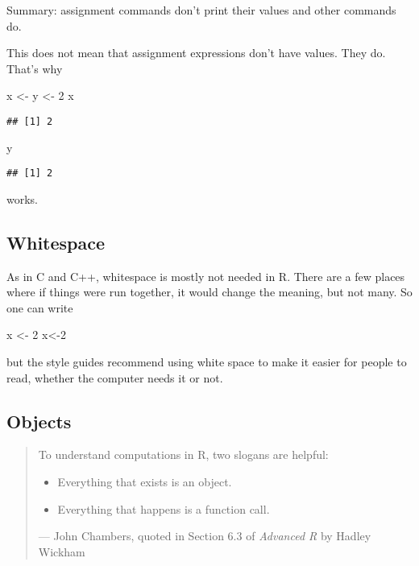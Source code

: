 \documentclass[
]{article}
\newenvironment{Shaded}{\begin{snugshade}}{\end{snugshade}}
\newcommand{\DecValTok}[1]{\textcolor[rgb]{0.00,0.00,0.81}{#1}}
\newcommand{\NormalTok}[1]{#1}
\newcommand{\OtherTok}[1]{\textcolor[rgb]{0.56,0.35,0.01}{#1}}
\providecommand{\tightlist}{%
  \setlength{\itemsep}{0pt}\setlength{\parskip}{0pt}}
\begin{document}
Summary: assignment commands don't print their values and other commands
do.

This does not mean that assignment expressions don't have values. They
do. That's why

\begin{Shaded}
\begin{Highlighting}[]
\NormalTok{x }\OtherTok{\textless{}{-}}\NormalTok{ y }\OtherTok{\textless{}{-}} \DecValTok{2}
\NormalTok{x}
\end{Highlighting}
\end{Shaded}

\begin{verbatim}
## [1] 2
\end{verbatim}

\begin{Shaded}
\begin{Highlighting}[]
\NormalTok{y}
\end{Highlighting}
\end{Shaded}

\begin{verbatim}
## [1] 2
\end{verbatim}

works.

\hypertarget{whitespace}{%
\subsection{Whitespace}\label{whitespace}}

As in C and C++, whitespace is mostly not needed in R. There are a few
places where if things were run together, it would change the meaning,
but not many. So one can write

\begin{Shaded}
\begin{Highlighting}[]
\NormalTok{x }\OtherTok{\textless{}{-}} \DecValTok{2}
\NormalTok{x}\OtherTok{\textless{}{-}}\DecValTok{2}
\end{Highlighting}
\end{Shaded}

but the style guides recommend using white space to make it easier for
people to read, whether the computer needs it or not.

\hypertarget{objects}{%
\subsection{Objects}\label{objects}}

\begin{quote}
To understand computations in R, two slogans are helpful:

\begin{itemize}
\tightlist
\item
  Everything that exists is an object.
\item
  Everything that happens is a function call.
\end{itemize}

--- John Chambers, quoted in Section 6.3 of \emph{Advanced R} by Hadley
Wickham
\end{quote}
\end{document}
